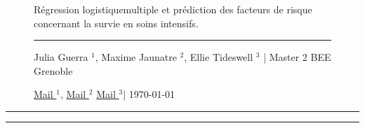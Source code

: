 \documentclass[10pt,a4paper,notitlepage,colorinlistoftodos]{article}
\begin{document}


\begin{figure}
   \centering
    \begin{minipage}{.75\textwidth}
    \begin{center}
    {\Large Régression logistiquemultiple et prédiction des facteurs de risque concernant la survie en soins
    intensifs.
    }
    \end{center}
    \rule{7em}{.4pt}\par
     Julia Guerra $^1$, Maxime Jaunatre $^2$, Ellie Tideswell $^3$ | Master 2 BEE Grenoble \par 
     \href{mailto:Julia.Julia@etu.univ-grenoble-alpes.fr}{Mail $^1$}, \href{mailto:maxime.jaunatre@etu.univ-grenoble-alpes.fr}{Mail $^2$} \href{mailto:etideswell@hotmail.co.uk}{Mail $^3$}| \today \par 
\end{minipage}
\end{figure}

\hrule
\listoftodos
\hrule\bigskip


\end{document}
